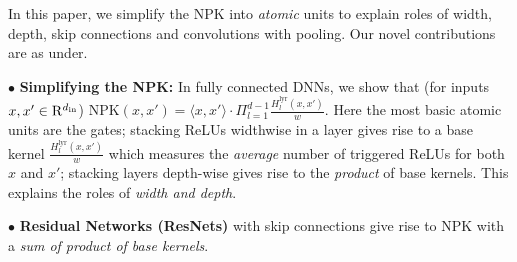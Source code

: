  In this paper, we simplify the NPK into \emph{atomic} units to explain roles of width, depth, skip connections and convolutions with pooling. Our novel contributions are as under.

$\bullet$ \textbf{Simplifying the NPK:} In fully connected DNNs, we show that (for inputs $x,x'\in\mathrm{R}^{d_{\text{in}}}$) NPK$(x,x')=\langle x,x'\rangle\cdot \Pi_{l=1}^{d-1} \frac{H^{\text{lyr}}_l(x,x')}{w}$. Here the most basic atomic units are the gates; stacking ReLUs widthwise in a layer gives rise to a base kernel $\frac{H^{\text{lyr}}_l(x,x')}{w}$ which measures the \emph{average} number of triggered ReLUs for both $x$ and $x'$; stacking layers depth-wise gives rise to the \emph{product} of base kernels. This explains the roles of \emph{width and depth}.

$\bullet$ \textbf{Residual Networks (ResNets)} with skip connections give rise to NPK with a \emph{ sum of product of base kernels}.

